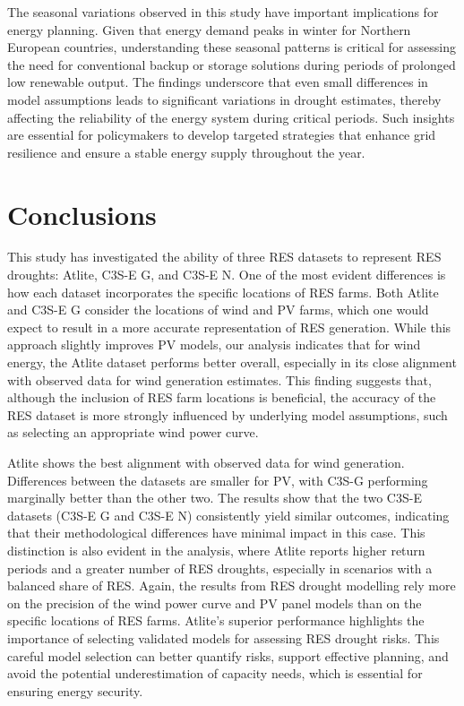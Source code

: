 \documentclass[preprint, 12pt]{elsarticle}
\begin{document}
The seasonal variations observed in this study have important implications for energy planning. Given that energy demand peaks in winter for Northern European countries, understanding these seasonal patterns is critical for assessing the need for conventional backup or storage solutions during periods of prolonged low renewable output. The findings underscore that even small differences in model assumptions leads to significant variations in drought estimates, thereby affecting the reliability of the energy system during critical periods. Such insights are essential for policymakers to develop targeted strategies that enhance grid resilience and ensure a stable energy supply throughout the year.

\section{Conclusions}
\label{sec:conclusions}

This study has investigated the ability of three RES datasets to represent RES droughts: Atlite, C3S-E G, and C3S-E N. One of the most evident differences is how each dataset incorporates the specific locations of RES farms. Both Atlite and C3S-E G consider the locations of wind and PV farms, which one would expect to result in a more accurate representation of RES generation. While this approach slightly improves PV models, our analysis indicates that for wind energy, the Atlite dataset performs better overall, especially in its close alignment with observed data for wind generation estimates. This finding suggests that, although the inclusion of RES farm locations is beneficial, the accuracy of the RES dataset is more strongly influenced by underlying model assumptions, such as selecting an appropriate wind power curve.

Atlite shows the best alignment with observed data for wind generation. Differences between the datasets are smaller for PV, with C3S-G performing marginally better than the other two. The results show that the two C3S-E datasets (C3S-E G and C3S-E N) consistently yield similar outcomes, indicating that their methodological differences have minimal impact in this case. This distinction is also evident in the analysis, where Atlite reports higher return periods and a greater number of RES droughts, especially in scenarios with a balanced share of RES. Again, the results from RES drought modelling rely more on the precision of the wind power curve and PV panel models than on the specific locations of RES farms. Atlite’s superior performance highlights the importance of selecting validated models for assessing RES drought risks. This careful model selection can better quantify risks, support effective planning, and avoid the potential underestimation of capacity needs, which is essential for ensuring energy security.
\end{document}
